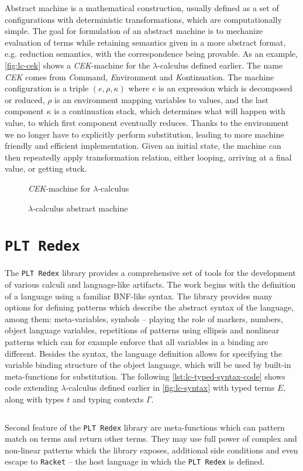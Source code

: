 \documentclass[inz, english, shortabstract]{iithesis}
\newcommand{\Redex}{\texttt{PLT Redex}}
\newcommand{\Racket}{\texttt{Racket}}
\newcommand{\LC}{\(\lambda\)-calculus}
\begin{document}
Abstract machine is a mathematical construction, usually defined as a set of configurations with deterministic transformations, which are computationally simple.
The goal for formulation of an abstract machine is to mechanize evaluation of terms while retaining semantics given in a more abstract format, e.g. reduction semantics, with the correspondence being provable\cite{Felleisen2009}.
As an example, \autoref{fig:lc-cek} shows a \emph{CEK}-machine for the \LC{} defined earlier.
The name \emph{CEK} comes from \emph{C}ommand, \emph{E}nvironment and \emph{K}ontinuation.
The machine configuration is a triple $ (e, \rho, \kappa) $ where $ e $ is an expression which is decomposed or reduced, $ \rho $ is an environment mapping variables to values, and the last component $ \kappa $ is a continuation stack, which determines what will happen with value, to which first component eventually reduces.
Thanks to the environment we no longer have to explicitly perform substitution, leading to more machine friendly and efficient implementation.
Given an initial state, the machine can then repeatedly apply transformation relation, either looping, arriving at a final value, or getting stuck. 
\begin{figure}
  \emph{CEK}-machine for \LC{}
  \caption{\LC{} abstract machine}
  \label{fig:lc-cek}
\end{figure}

\section{\Redex}
The \Redex{}\cite{Felleisen2009} library provides a comprehensive set of tools for the development of various calculi and language-like artifacts.
The work begins with the definition of a language using a familiar BNF-like syntax.
The library provides many options for defining patterns which describe the abstract syntax of the language, among them: meta-variables, symbols -- playing the role of markers, numbers, object language variables, repetitions of patterns using ellipsis and nonlinear patterns which can for example enforce that all variables in a binding are different.
Besides the syntax, the language definition allows for specifying the variable binding structure of the object language, which will be used by built-in meta-functions for substitution.
The following \autoref{lst:lc-typed-syntax-code} shows code extending \LC{} defined earlier in \autoref{fig:lc-syntax} with typed terms $ E $, along with types $ t $ and typing contexts $ \Gamma $.
\begin{listing}[H]
  \inputminted[firstline=26, lastline=32]{Racket}{../lc/lc.rkt}
  \caption{Typed \LC{} with numbers in \Redex{}}
  \label{lst:lc-typed-syntax-code}
\end{listing}
Second feature of the \Redex{} library are meta-functions which can pattern match on terms and return other terms.
They may use full power of complex and non-linear patterns which the library exposes, additional side conditions and even escape to \Racket{} -- the host language in which the \Redex{} is defined.
\end{document}
